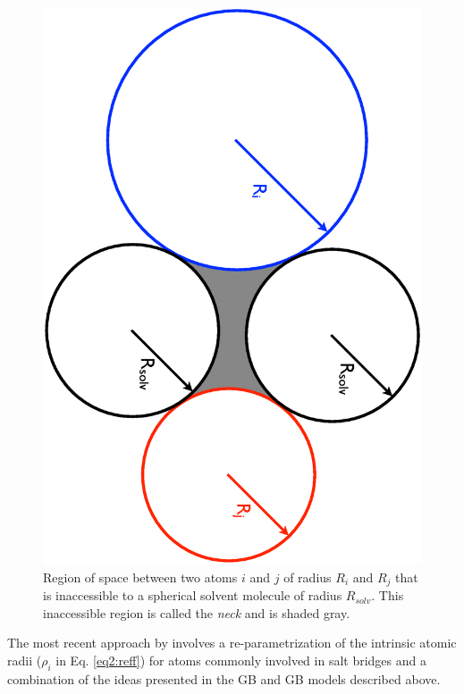 \begin{figure}
   \includegraphics[height=6.5in, angle=90, trim=1cm 0.5cm 1cm 0.5cm, clip=true]
                   {Interstitial.ps}
   \caption[Region of space between two atoms $i$ and $j$ of radius $R_i$ and
            $R_j$ that is inaccessible to a spherical solvent molecule of radius
            $R_{solv}$.]
           {Region of space between two atoms $i$ and $j$ of radius $R_i$ and
            $R_j$ that is inaccessible to a spherical solvent molecule of radius
            $R_{solv}$. This inaccessible region is called the \emph{neck} and
            is shaded gray.}
   \label{fig2:Interstitial}
\end{figure}

The most recent approach by \citeauthor{Nguyen_JChemTheoryComput_2013_ASAP}
involves a re-parametrization of the intrinsic atomic radii ($\rho_i$ in Eq.
\ref{eq2:reff}) for atoms commonly involved in salt bridges and a combination of
the ideas presented in the GB and GB models described
above. \cite{Nguyen_JChemTheoryComput_2013_ASAP}


